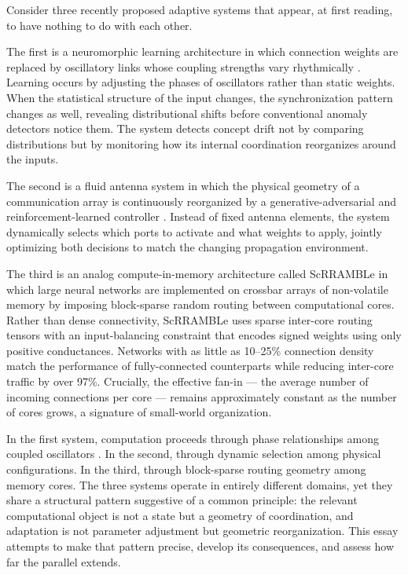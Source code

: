 \documentclass[11pt, a4paper]{article}
\theoremstyle{definition}
\theoremstyle{remark}
\begin{document}
Consider three recently proposed adaptive systems that appear, at first
reading, to have nothing to do with each other.

The first is a neuromorphic learning architecture in which connection weights
are replaced by oscillatory links whose coupling strengths vary rhythmically
\cite{whitehouse2026}. Learning occurs by adjusting the phases of oscillators
rather than static weights. When the statistical structure of the input
changes, the synchronization pattern changes as well, revealing distributional
shifts before conventional anomaly detectors notice them. The system detects
concept drift not by comparing distributions but by monitoring how its
internal coordination reorganizes around the inputs.

The second is a fluid antenna system in which the physical geometry of a
communication array is continuously reorganized by a generative-adversarial
and reinforcement-learned controller \cite{zhang2026}. Instead of fixed
antenna elements, the system dynamically selects which ports to activate and
what weights to apply, jointly optimizing both decisions to match the
changing propagation environment.

The third is an analog compute-in-memory architecture called ScRRAMBLe
\cite{jaltare2026} in which large neural networks are implemented on
crossbar arrays of non-volatile memory by imposing block-sparse random
routing between computational cores. Rather than dense connectivity,
ScRRAMBLe uses sparse inter-core routing tensors with an input-balancing
constraint that encodes signed weights using only positive conductances.
Networks with as little as 10--25\% connection density match the performance
of fully-connected counterparts while reducing inter-core traffic by over
97\%. Crucially, the effective fan-in --- the average number of incoming
connections per core --- remains approximately constant as the number of
cores grows, a signature of small-world organization.

In the first system, computation proceeds through phase relationships among
coupled oscillators \cite{kuramoto1984, strogatz2003, acebron2005}. In the
second, through dynamic selection among physical configurations. In the
third, through block-sparse routing geometry among memory cores. The three
systems operate in entirely different domains, yet they share a structural
pattern suggestive of a common principle: the relevant computational object
is not a state but a geometry of coordination, and adaptation is not
parameter adjustment but geometric reorganization. This essay attempts to
make that pattern precise, develop its consequences, and assess how far
the parallel extends.
\end{document}
